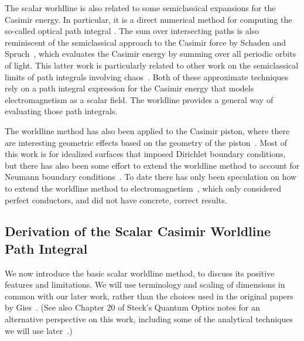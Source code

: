 The scalar worldline is also related to some semiclassical expansions for the Casimir energy.  
In particular, it is a direct numerical method for computing the so-called optical path integral
\cite{Scardicchio2005, Scardicchio2006}.  The sum over intersecting paths is also reminiscent 
of the semiclassical approach to the Casimir force by Schaden and Spruch~\cite{Schaden1998}, which evaluates 
the Casimir energy by summing over all periodic orbits of light.  This latter work is particularly 
related to other work on the semiclassical limits of path integrals involving chaos~\cite{Gutzwiller1990}.
Both of these approximate techniques rely on a path integral expression for the Casimir energy that models electromagnetism as a
scalar field. The worldline provides a general way of evaluating those path integrals.   

The worldline method has also been applied to the Casimir piston, where there are interesting geometric effects
based on the geometry of the piston~\cite{Schaden2009,Schaden2009a}.
Most of this work is for idealized surfaces that imposed Dirichlet boundary conditions, but 
there has also been some effort to extend the worldline method to account for Neumann boundary
conditions~\cite{Fosco2010}.  To date there has only been speculation on how to extend the 
worldline method to electromagnetism~\cite{Aehlig2011}, which only considered perfect conductors,
and did not have concrete, correct results.    



\subsection{Derivation of the Scalar Casimir Worldline Path Integral}
\label{sec:dirichlet_worldline_derivation}
We now introduce the basic scalar worldline method, to discuss its positive features and limitations. 
We will use terminology and scaling of dimensions in common with our later work, rather than the 
choices used in the original papers by Gies\etal~\cite{Gies2003}.
(See also Chapter 20 of Steck's Quantum Optics notes for an alternative perspective on this work, including
some of the analytical techniques we will use later~\cite{SteckNotes}.)

